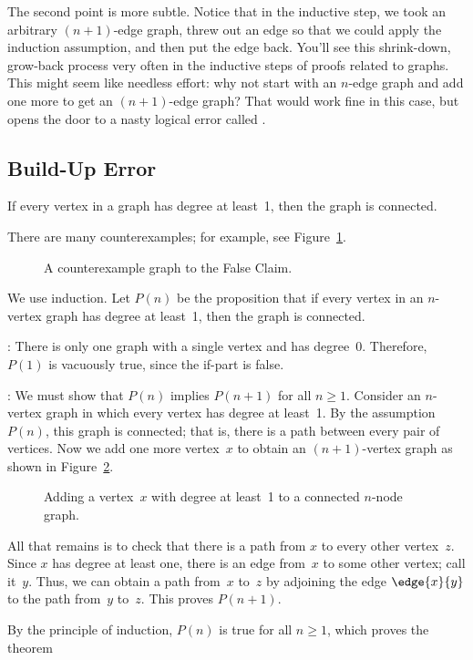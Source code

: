 The second point is more subtle.  Notice that in the inductive step,
we took an arbitrary $(n+1)$-edge graph, threw out an edge so that
we could apply the induction assumption, and then put the edge back.
You'll see this shrink-down, grow-back process very often in the
inductive steps of proofs related to graphs.  This might seem like
needless effort: why not start with an $n$-edge graph and add one
more to get an $(n+1)$-edge graph?  That would work fine in this
case, but opens the door to a nasty logical error called
.

\subsection{Build-Up Error}

\begin{falseclm*}
If every vertex in a graph has degree at least~1, then the graph is
connected.
\end{falseclm*}

There are many counterexamples; for example, see Figure~\ref{fig:5Z}.

\begin{figure}


\caption{A counterexample graph to the False Claim.}

\label{fig:5Z}
\end{figure}

\begin{falseproof}
We use induction.  Let $P(n)$ be the proposition that if every vertex
in an $n$-vertex graph has degree at least~1, then the graph is
connected.

: There is only one graph with a single
vertex and has degree~0.  Therefore, $P(1)$ is vacuously true, since
the if-part is false.

: We must show that $P(n)$ implies
$P(n+1)$ for all $n \ge 1$.  Consider an $n$-vertex graph in which
every vertex has degree at least~1.  By the assumption~$P(n)$, this
graph is connected; that is, there is a path between every pair of
vertices.  Now we add one more vertex~$x$ to obtain an $(n+1)$-vertex
graph as shown in Figure~\ref{fig:5Y}.

\begin{figure}


\caption{Adding a vertex~$x$ with degree at least~1 to a connected
  $n$-node graph.}

\label{fig:5Y}

\end{figure}

All that remains is to check that there is a path from $x$ to every
other vertex~$z$.  Since $x$ has degree at least one, there is an edge
from~$x$ to some other vertex; call it~$y$.  Thus, we can obtain a
path from~$x$ to~$z$ by adjoining the edge $\edge{x}{y}$ to the path
from~$y$ to~$z$.  This proves $P(n + 1)$.

By the principle of induction, $P(n)$ is true for all  $n \ge 1$,
which proves the theorem
\end{falseproof}

